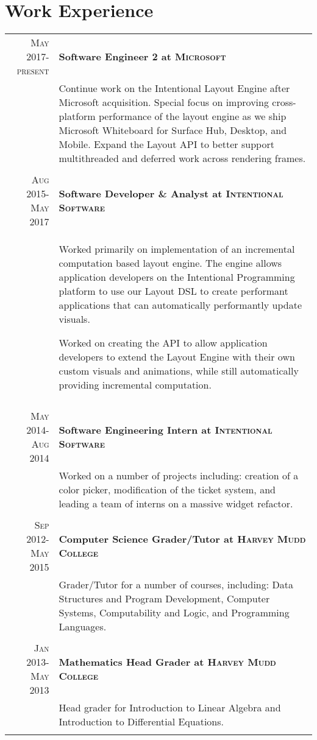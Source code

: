 \documentclass[letterpaper,10pt]{article} %
\newcommand{\work}[3]{ \textsc{#1} & \textbf{#2} \\
& #3\\
\multicolumn{2}{c}{} \\}
\begin{document}
\section{Work Experience}

\begin{tabular}{r|p{14.5cm}} %


\work{May 2017-present}{Software Engineer 2 at \textsc{Microsoft}}{
  Continue work on the Intentional Layout Engine after Microsoft acquisition. Special focus on improving cross-platform performance of the layout engine as we ship Microsoft Whiteboard
  for Surface Hub, Desktop, and Mobile. Expand the Layout API to better support multithreaded and deferred work across rendering frames.
}


\work{Aug 2015-May 2017}{Software Developer \& Analyst at \textsc{Intentional Software}}{
  Worked primarily on implementation of an incremental computation based layout engine. The engine allows application developers on the Intentional Programming
  platform to use our Layout DSL to create performant applications that can automatically performantly update visuals. 

  Worked on creating
  the API to allow application developers to extend the Layout Engine with their own custom visuals and animations, while still automatically providing incremental
  computation.
}


\work{May 2014-Aug 2014}{Software Engineering Intern at \textsc{Intentional Software}}{
	Worked on a number of projects including: creation of a color picker, modification of the ticket system, and
	leading a team of interns on a massive widget refactor.
}


\work{Sep 2012-May 2015}{Computer Science Grader/Tutor at \textsc{Harvey Mudd College}}{
	Grader/Tutor for a number of courses, including: Data Structures and Program Development, Computer Systems, Computability and Logic, and Programming Languages.
}


\work{Jan 2013-May 2013}{Mathematics Head Grader at \textsc{Harvey Mudd College}}{
	Head grader for Introduction to Linear Algebra and Introduction to Differential Equations.
}

\end{tabular}
\vspace{-3mm} %
\end{document}
